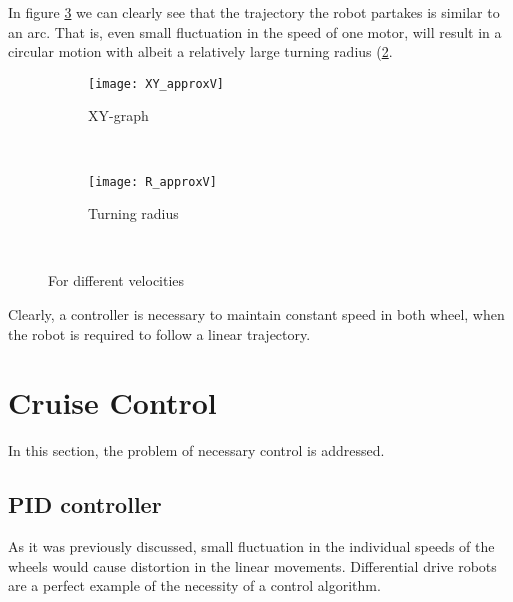 In figure \ref{fig:approxV} we can clearly see that the trajectory the robot partakes is similar to an arc. That is, even small fluctuation in the speed of one motor, will result in a circular motion with albeit a relatively large turning radius (\ref{fig:RapproxV}. 

\newpage

\begin{figure}[h]
    \centering
    \begin{subfigure}[h]{0.47\textwidth}
        \texttt{[image: XY\_approxV]}
        \caption{XY-graph}
        \label{fig:approxV}
    \end{subfigure}
    ~ %
    \begin{subfigure}[h]{0.47\textwidth}
        \texttt{[image: R\_approxV]}
        \caption{Turning radius}
        \label{fig:RapproxV}
    \end{subfigure}
    ~ %
    \caption{For different velocities}\label{fig:approxV}
\end{figure}

Clearly, a controller is necessary to maintain constant speed in both wheel, when the robot is required to follow a linear trajectory.

\section{Cruise Control}

In this section, the problem of necessary control is addressed. 

\subsection{PID controller}

As it was previously discussed, small fluctuation in the individual speeds of the wheels would cause distortion in the linear movements. Differential drive robots are a perfect example of the necessity of a control algorithm.

